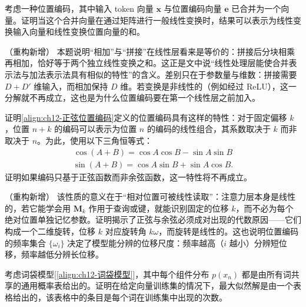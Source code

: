 \documentclass[../../main.tex]{subfiles}
\begin{document}
\begin{exercise}\label{exercise:ch12-09}
考虑一种位置编码，其中输入 token 向量 $\mathbf{x}$ 与位置编码向量 $\mathbf{e}$ 已合并为一个向量。证明当这个合并向量在通过矩阵进行一般线性变换时，结果可以表示为线性变换输入向量和线性变换位置向量的和。
\end{exercise}

\begin{remark}（重构新增）
本题说明“相加”与“拼接”在线性层看来是等价的：拼接后分块相乘再相加，恰好等于两个独立线性变换之和。这正是文中说“线性处理层能使合并表示法与加法表示法具有相似的特性”的含义。差别只在于参数量与维数：拼接需要 $D+D'$ 维输入，而相加保持 $D$ 维。若变换是非线性的（例如经过 ReLU），这一分解就不再成立，这也是为什么位置编码要在第一个线性层之前加入。
\end{remark}

\begin{exercise}\label{exercise:ch12-10}
证明\eqref{align:ch12-正弦位置编码}定义的位置编码具有这样的特性：对于固定偏移 $k$，位置 $n+k$ 的编码可以表示为位置 $n$ 的编码的线性组合，其系数取决于 $k$ 而非取决于 $n$。为此，使用以下三角恒等式：
\begin{align}
\cos(A+B)=\cos A\cos B-\sin A\sin B
\label{align:ch12-余弦和角}
\end{align}
\begin{align}
\sin(A+B)=\cos A\sin B+\sin A\cos B.
\label{align:ch12-正弦和角}
\end{align}
证明如果编码只基于正弦函数而非余弦函数，这一特性将不再成立。
\end{exercise}

\begin{remark}（重构新增）
该性质的意义在于“相对位置可被线性读取”：注意力层本身是线性的，若它能学会用 $\mathbf{M}_k$ 作用于查询或键，就能识别固定的位移 $k$，而不必为每个绝对位置单独记忆参数。证明揭示了正弦与余弦必须成对出现的代数原因——它们构成一个二维旋转，位移 $k$ 对应旋转角 $k\omega$，而旋转是线性的。这也说明位置编码的频率集合 $\{\omega_i\}$ 决定了模型能分辨的位移尺度：频率越高（$i$ 越小）分辨短位移，频率越低分辨长位移。
\end{remark}

\begin{exercise}[（$\star$）]\label{exercise:ch12-11}
考虑词袋模型[\eqref{align:ch12-词袋模型}]，其中每个组件分布 $p(x_n)$ 都是由所有词共享的通用概率表给出的。证明在给定向量训练集的情况下，最大似然解是由一个表格给出的，该表格中的条目是每个词在训练集中出现的次数。
\end{exercise}
\end{document}
